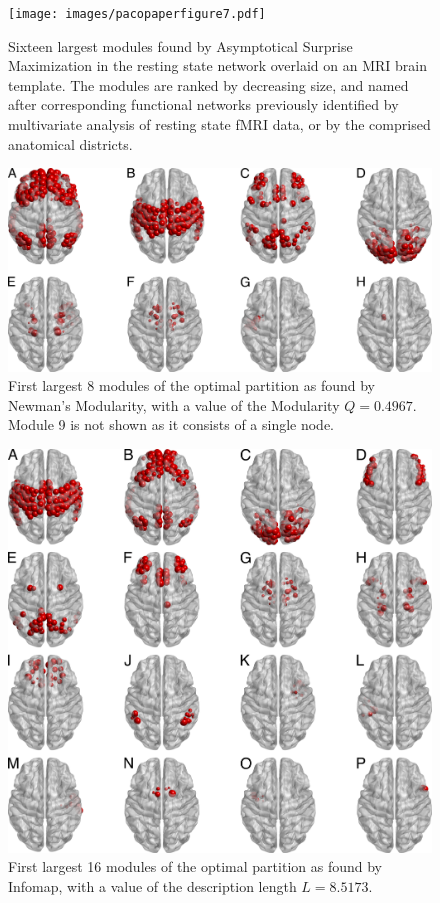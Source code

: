 \begin{figure}[!htb]
\texttt{[image: images/pacopaperfigure7.pdf]}
\caption{Sixteen largest modules found by Asymptotical Surprise Maximization in the resting state network overlaid on an MRI brain template. The modules are ranked by decreasing size, and named after corresponding functional networks previously identified by multivariate analysis of resting state fMRI data, or by the comprised anatomical districts.}
\label{fig:cervellini4x4}
\end{figure}
\begin{figure}[htb]
\centering
\includegraphics[width=1\textwidth]{images/figure_cervellini_Louvain_Q_0_49674.png}
\caption{First largest 8 modules of the optimal partition as found by Newman's Modularity, with a value of the Modularity $Q=0.4967$. Module 9 is not shown as it consists of a single node.}
\label{fig:newmancervellini}
\end{figure}
\begin{figure}[htb]
\centering
\includegraphics[width=1\textwidth]{images/figure_cervellini_infomap_L_8_5173.png}
\caption{First largest 16 modules of the optimal partition as found by Infomap, with a value of the description length $L=8.5173$.}
\label{fig:infomapcervellini}
\end{figure}

